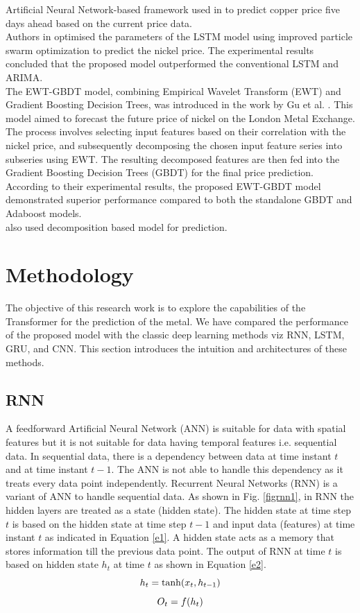 \documentclass{ws-ijait}
\begin{document}
Artificial Neural Network-based framework used in \cite{mendez2019artificial} to predict copper price five days ahead based on the current price data.\\
Authors in \cite{shao2019nickel} optimised the parameters of the LSTM model using improved particle swarm optimization to predict the nickel price. The experimental results concluded that the proposed model outperformed the conventional LSTM and ARIMA.\\
The EWT-GBDT model, combining Empirical Wavelet Transform (EWT) and Gradient Boosting Decision Trees, was introduced in the work by Gu et al. \cite{gu2021forecasting}. This model aimed to forecast the future price of nickel on the London Metal Exchange. The process involves selecting input features based on their correlation with the nickel price, and subsequently decomposing the chosen input feature series into subseries using EWT. The resulting decomposed features are then fed into the Gradient Boosting Decision Trees (GBDT) for the final price prediction. According to their experimental results, the proposed EWT-GBDT model demonstrated superior performance compared to both the standalone GBDT and Adaboost models.\\
\cite{zhao2022risk} also used decomposition based model for prediction.

\section{Methodology}
The objective of this research work is to explore the capabilities of the Transformer for the prediction of the metal. We have compared the performance of the proposed model with the classic deep learning methods viz RNN, LSTM, GRU, and CNN. This section introduces the intuition and architectures of these methods.
\subsection{RNN}
A feedforward Artificial Neural Network (ANN) is suitable for data with spatial features but it is not suitable for data having temporal features i.e. sequential data. In sequential data, there is a dependency between data at time instant $t$ and at time instant $t-1$. The ANN is not able to handle this dependency as it treats every data point independently. Recurrent Neural Networks (RNN) is a variant of ANN to handle sequential data. As shown in Fig. \ref{figrnn1}, in RNN the hidden layers are treated as a state (hidden state). The hidden state at time step $t$ is based on the hidden state at time step $t-1$ and input data (features) at time instant $t$ as indicated in Equation \ref{e1}. A hidden state acts as a memory that stores information till the previous data point. The output of RNN at time $t$ is based on hidden state $h_t$ at time $t$ as shown in Equation \ref{e2}.
\begin{equation} \label{e1}
	h_t = \tanh(x_{t},h_{t-1})\\
\end{equation}
\begin{equation}  \label{e2}
	O_t = f(h_{t})\\
\end{equation}
\end{document}
